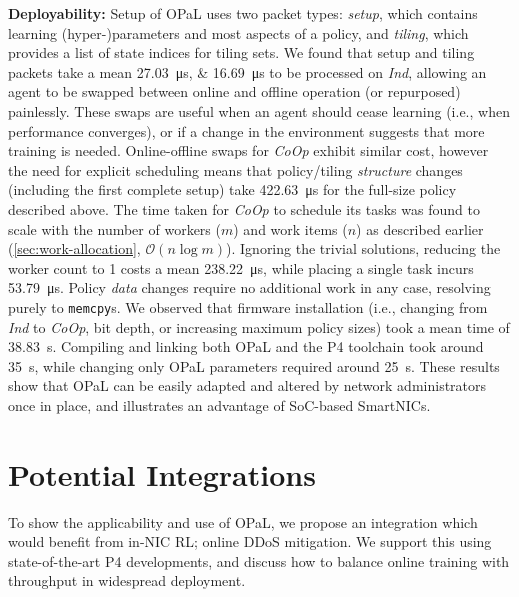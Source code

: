 \documentclass[
conference
,10pt
]{IEEEtran}
\newcommand{\fakepara}[1]{\noindent\textbf{#1:}}
\newcommand{\approachshort}{OPaL}
\newcommand{\Coopfw}{\emph{CoOp}}
\newcommand{\Indfw}{\emph{Ind}}
\begin{document}
\fakepara{Deployability}
Setup of \approachshort{} uses two packet types: \emph{setup}, which contains learning (hyper-)parameters and most aspects of a policy, and \emph{tiling}, which provides a list of state indices for tiling sets.
We found that setup and tiling packets take a mean \qtylist{27.03;16.69}{\micro\second} to be processed on \Indfw{}, allowing an agent to be swapped between online and offline operation (or repurposed) painlessly.
These swaps are useful when an agent should cease learning (i.e., when performance converges), or if a change in the environment suggests that more training is needed.
Online-offline swaps for \Coopfw{} exhibit similar cost, however the need for explicit scheduling means that policy/tiling \emph{structure} changes (including the first complete setup) take \SI{422.63}{\micro\second} for the full-size policy described above.
The time taken for \Coopfw{} to schedule its tasks was found to scale with the number of workers ($m$) and work items ($n$) as described earlier (\cref{sec:work-allocation}, $\mathcal{O}{\left(n\log{m}\right)}$).
Ignoring the trivial solutions, reducing the worker count to \num{1} costs a mean \SI{238.22}{\micro\second}, while placing a single task incurs \SI{53.79}{\micro\second}.
Policy \emph{data} changes require no additional work in any case, resolving purely to \texttt{memcpy}s.
We observed that firmware installation (i.e., changing from \Indfw{} to \Coopfw{}, bit depth, or increasing maximum policy sizes) took a mean time of \SI{38.83}{\second}.
Compiling and linking both \approachshort{} and the P4 toolchain took around \SI{35}{\second}, while changing only \approachshort{} parameters required around \SI{25}{\second}.
These results show that \approachshort{} can be easily adapted and altered by network administrators once in place, and illustrates an advantage of SoC-based SmartNICs.

\section{Potential Integrations}\label{sec:potential-integrations}
To show the applicability and use of \approachshort{}, we propose an integration which would benefit from in-NIC RL; online DDoS mitigation.
We support this using state-of-the-art P4 developments, and discuss how to balance online training with throughput in widespread deployment.
\end{document}
